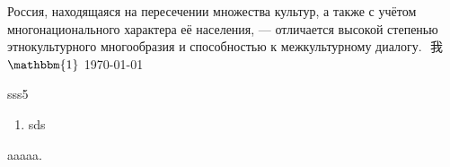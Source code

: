 \documentclass[../templates/main]{subfiles}
\begin{document}
Россия, находящаяся на пересечении множества культур, а также
с учётом многонационального характера её населения, — отличается
высокой степенью этнокультурного многообразия и способностью к
межкультурному диалогу.
\(\)
我
\(\mathbbm{1}\)
\today
\begin{newword}{sss}{}{5}\label{wo:sss}
  \begin{enumerate}[label=(\arabic*)]
    \item sds
  \end{enumerate}
\end{newword}
aaaaa.
\end{document}
